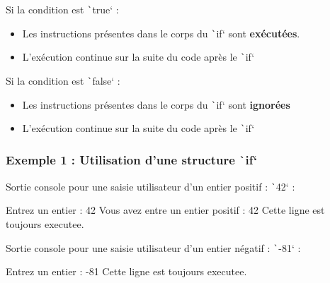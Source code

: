 \documentclass[10pt]{article}
\begin{document}
Si la condition est \texttt`true` :
\begin{itemize}
    \item Les instructions présentes dans le corps du \texttt`if` sont \textbf{exécutées}.
    \item L'exécution continue sur la suite du code après le \texttt`if` 
\end{itemize}
Si la condition est \texttt`false` :
\begin{itemize}
    \item Les instructions présentes dans le corps du \texttt`if` sont \textbf{ignorées}
    \item L'exécution continue sur la suite du code après le \texttt`if` 
\end{itemize}

\subsubsection{Exemple 1 : Utilisation d'une structure \texttt`if`}


\bigskip
Sortie console pour une saisie utilisateur d'un entier positif : \texttt`42`  :

\begin{textcode}
    Entrez un entier : 42
    Vous avez entre un entier positif : 42
    Cette ligne est toujours executee.
\end{textcode}

Sortie console pour une saisie utilisateur d'un entier négatif : \texttt`-81`  :

\begin{textcode}
    Entrez un entier : -81
    Cette ligne est toujours executee.
\end{textcode}
\end{document}
